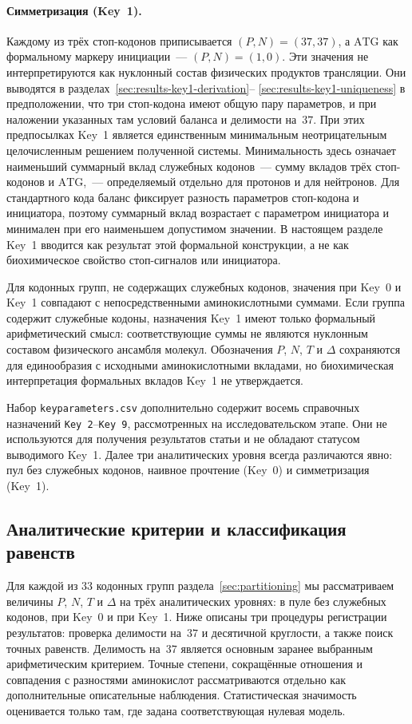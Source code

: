 \documentclass[11pt,a4paper]{article}
\renewcommand{\_}{\origunderscore\allowbreak}
\begin{document}
\paragraph{Симметризация (Key~1).}
Каждому из трёх стоп-кодонов приписывается
$(P,N)=(37,37)$, а $\mathrm{ATG}$ как формальному маркеру инициации~---
$(P,N)=(1,0)$. Эти значения не интерпретируются как нуклонный состав
физических продуктов трансляции. Они выводятся в
разделах~\ref{sec:results-key1-derivation}--%
\ref{sec:results-key1-uniqueness} в предположении, что три стоп-кодона
имеют общую пару параметров, и при наложении указанных там условий
баланса и делимости на~$37$. При этих предпосылках Key~1 является
единственным минимальным неотрицательным целочисленным решением
полученной системы. Минимальность здесь означает наименьший суммарный вклад
служебных кодонов~--- сумму вкладов трёх стоп-кодонов и
$\mathrm{ATG}$,~--- определяемый отдельно для протонов и
для нейтронов. Для стандартного кода баланс фиксирует
разность параметров стоп-кодона и инициатора, поэтому
суммарный вклад возрастает с параметром инициатора и
минимален при его наименьшем допустимом значении. В настоящем разделе Key~1 вводится
как результат этой формальной конструкции, а не как биохимическое
свойство стоп-сигналов или инициатора.

Для кодонных групп, не содержащих служебных кодонов, значения при
Key~0 и Key~1 совпадают с непосредственными аминокислотными суммами.
Если группа содержит служебные кодоны, назначения Key~1 имеют только
формальный арифметический смысл: соответствующие суммы не являются
нуклонным составом физического ансамбля молекул. Обозначения $P$, $N$, $T$ и $\Delta$ сохраняются
для единообразия с исходными аминокислотными вкладами,
но биохимическая интерпретация формальных вкладов Key~1
не утверждается.

Набор \texttt{key\_parameters.csv} дополнительно содержит восемь
справочных назначений \texttt{Key~2}--\texttt{Key~9}, рассмотренных на
исследовательском этапе. Они не используются для получения результатов
статьи и не обладают статусом выводимого Key~1. Далее три аналитических
уровня всегда различаются явно: пул без служебных кодонов, наивное
прочтение (Key~0) и симметризация (Key~1).

\subsection{Аналитические критерии и классификация равенств}
\label{sec:criteria}

Для каждой из $33$ кодонных групп раздела~\ref{sec:partitioning} мы
рассматриваем величины $P$, $N$, $T$ и $\Delta$ на трёх аналитических
уровнях: в пуле без служебных кодонов, при Key~0 и при Key~1. Ниже
описаны три процедуры регистрации результатов:
проверка делимости на~$37$ и десятичной круглости, а также поиск точных
равенств. Делимость на~$37$ является основным заранее выбранным
арифметическим критерием. Точные степени, сокращённые отношения и
совпадения с разностями аминокислот рассматриваются отдельно как
дополнительные описательные наблюдения. Статистическая значимость
оценивается только там, где задана соответствующая нулевая модель.
\end{document}

